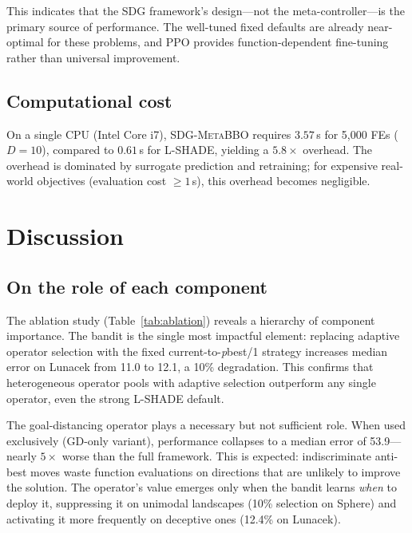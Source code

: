 \documentclass[preprint,12pt,number]{elsarticle}
\newcommand{\sdg}{\textsc{SDG-MetaBBO}}
\begin{document}
This indicates that the SDG framework's design---not the meta-controller---is the primary source of performance. The well-tuned fixed defaults are already near-optimal for these problems, and PPO provides function-dependent fine-tuning rather than universal improvement.

\subsection{Computational cost}
\label{sec:cost}

On a single CPU (Intel Core i7), \sdg{} requires $3.57$\,s for 5{,}000 FEs ($D = 10$), compared to $0.61$\,s for L-SHADE, yielding a $5.8\times$ overhead. The overhead is dominated by surrogate prediction and retraining; for expensive real-world objectives (evaluation cost $\geq 1$\,s), this overhead becomes negligible.

\section{Discussion}
\label{sec:discussion}

\subsection{On the role of each component}

The ablation study (Table~\ref{tab:ablation}) reveals a hierarchy of component importance. The bandit is the single most impactful element: replacing adaptive operator selection with the fixed current-to-\emph{p}best/1 strategy increases median error on Lunacek from 11.0 to 12.1, a 10\% degradation. This confirms that heterogeneous operator pools with adaptive selection outperform any single operator, even the strong L-SHADE default.

The goal-distancing operator plays a necessary but not sufficient role. When used exclusively (GD-only variant), performance collapses to a median error of 53.9---nearly $5\times$ worse than the full framework. This is expected: indiscriminate anti-best moves waste function evaluations on directions that are unlikely to improve the solution. The operator's value emerges only when the bandit learns \emph{when} to deploy it, suppressing it on unimodal landscapes (10\% selection on Sphere) and activating it more frequently on deceptive ones (12.4\% on Lunacek).
\end{document}
